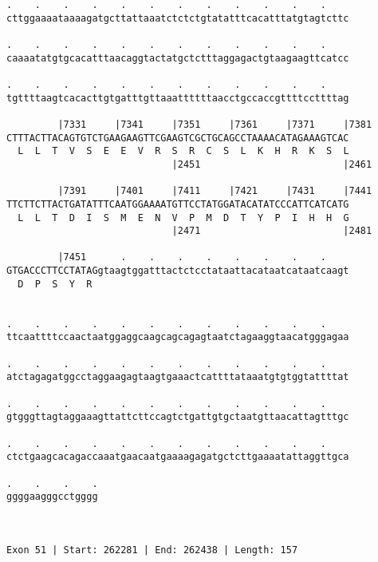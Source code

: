\documentclass{article}
\begin{document}
\begin{Verbatim}
.    .    .    .    .    .    .    .    .    .    .    .    
cttggaaaataaaagatgcttattaaatctctctgtatatttcacatttatgtagtcttc
                                                            
.    .    .    .    .    .    .    .    .    .    .    .    
caaaatatgtgcacatttaacaggtactatgctctttaggagactgtaagaagttcatcc
                                                            
.    .    .    .    .    .    .    .    .    .    .    .    
tgttttaagtcacacttgtgatttgttaaattttttaacctgccaccgttttccttttag
                                                            
         |7331     |7341     |7351     |7361     |7371     |7381
CTTTACTTACAGTGTCTGAAGAAGTTCGAAGTCGCTGCAGCCTAAAACATAGAAAGTCAC
  L  L  T  V  S  E  E  V  R  S  R  C  S  L  K  H  R  K  S  L
                             |2451                         |2461
  
         |7391     |7401     |7411     |7421     |7431     |7441
TTCTTCTTACTGATATTTCAATGGAAAATGTTCCTATGGATACATATCCCATTCATCATG
  L  L  T  D  I  S  M  E  N  V  P  M  D  T  Y  P  I  H  H  G
                             |2471                         |2481
  
         |7451      .    .    .    .    .    .    .    .    
GTGACCCTTCCTATAGgtaagtggatttactctcctataattacataatcataatcaagt
  D  P  S  Y  R                                             
                                                            
  
.    .    .    .    .    .    .    .    .    .    .    .    
ttcaattttccaactaatggaggcaagcagcagagtaatctagaaggtaacatgggagaa
                                                            
.    .    .    .    .    .    .    .    .    .    .    .    
atctagagatggcctaggaagagtaagtgaaactcattttataaatgtgtggtattttat
                                                            
.    .    .    .    .    .    .    .    .    .    .    .    
gtgggttagtaggaaagttattcttccagtctgattgtgctaatgttaacattagtttgc
                                                            
.    .    .    .    .    .    .    .    .    .    .    .    
ctctgaagcacagaccaaatgaacaatgaaaagagatgctcttgaaaatattaggttgca
                                                            
.    .    .    .
ggggaagggcctgggg
                
                
 
Exon 51 | Start: 262281 | End: 262438 | Length: 157




\end{Verbatim}
\end{document}
